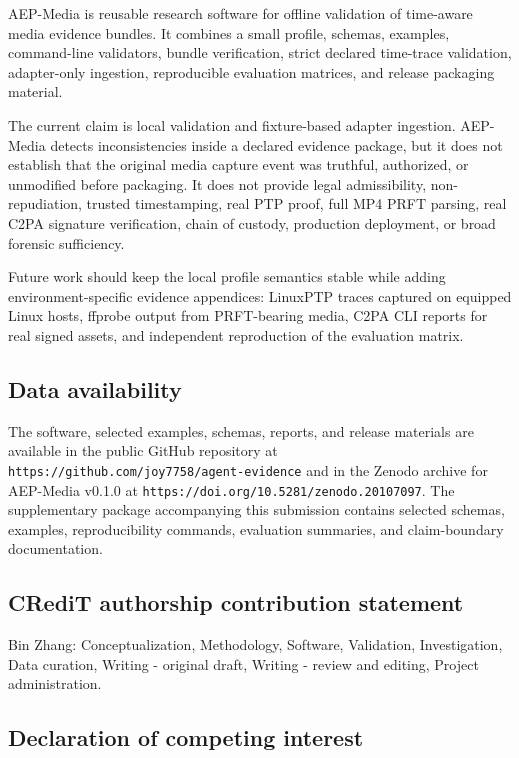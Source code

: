 \documentclass[
]{article}
\begin{document}
AEP-Media is reusable research software for offline validation of
time-aware media evidence bundles. It combines a small profile, schemas,
examples, command-line validators, bundle verification, strict declared
time-trace validation, adapter-only ingestion, reproducible evaluation
matrices, and release packaging material.

The current claim is local validation and fixture-based adapter
ingestion. AEP-Media detects inconsistencies inside a declared evidence
package, but it does not establish that the original media capture event
was truthful, authorized, or unmodified before packaging. It does not
provide legal admissibility, non-repudiation, trusted timestamping, real
PTP proof, full MP4 PRFT parsing, real C2PA signature verification,
chain of custody, production deployment, or broad forensic sufficiency.

Future work should keep the local profile semantics stable while adding
environment-specific evidence appendices: LinuxPTP traces captured on
equipped Linux hosts, ffprobe output from PRFT-bearing media, C2PA CLI
reports for real signed assets, and independent reproduction of the
evaluation matrix.

\subsection{Data availability}\label{data-availability}

The software, selected examples, schemas, reports, and release materials
are available in the public GitHub repository at
\texttt{https://github.com/joy7758/agent-evidence} and in the Zenodo
archive for AEP-Media v0.1.0 at
\texttt{https://doi.org/10.5281/zenodo.20107097}. The supplementary
package accompanying this submission contains selected schemas,
examples, reproducibility commands, evaluation summaries, and
claim-boundary documentation.

\subsection{CRediT authorship contribution
statement}\label{credit-authorship-contribution-statement}

Bin Zhang: Conceptualization, Methodology, Software, Validation,
Investigation, Data curation, Writing - original draft, Writing - review
and editing, Project administration.

\subsection{Declaration of competing
interest}\label{declaration-of-competing-interest}
\end{document}
